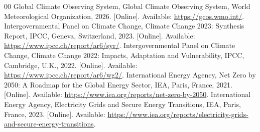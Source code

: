 \documentclass[conference]{IEEEtran}
\begin{document}
\begin{thebibliography}{00}
 Global Climate Observing System, Global Climate Observing System, World Meteorological Organization, 2026. [Online]. Available: \url{https://gcos.wmo.int/}.
 Intergovernmental Panel on Climate Change, Climate Change 2023: Synthesis Report, IPCC, Geneva, Switzerland, 2023. [Online]. Available: \url{https://www.ipcc.ch/report/ar6/syr/}.
 Intergovernmental Panel on Climate Change, Climate Change 2022: Impacts, Adaptation and Vulnerability, IPCC, Cambridge, U.K., 2022. [Online]. Available: \url{https://www.ipcc.ch/report/ar6/wg2/}.
 International Energy Agency, Net Zero by 2050: A Roadmap for the Global Energy Sector, IEA, Paris, France, 2021. [Online]. Available: \url{https://www.iea.org/reports/net-zero-by-2050}.
 International Energy Agency, Electricity Grids and Secure Energy Transitions, IEA, Paris, France, 2023. [Online]. Available: \url{https://www.iea.org/reports/electricity-grids-and-secure-energy-transitions}.
\end{thebibliography}
\end{document}

